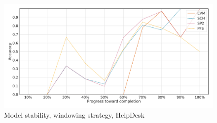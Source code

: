 \begin{figure}[!htb]
    \centering
    \includegraphics[width=\textwidth]{gfx/helpdesk/windowed_stability.pdf}
    \caption{Model stability, windowing strategy, HelpDesk}
    \label{fig:helpdesk-windowed-stability}
\end{figure}
\FloatBarrier


